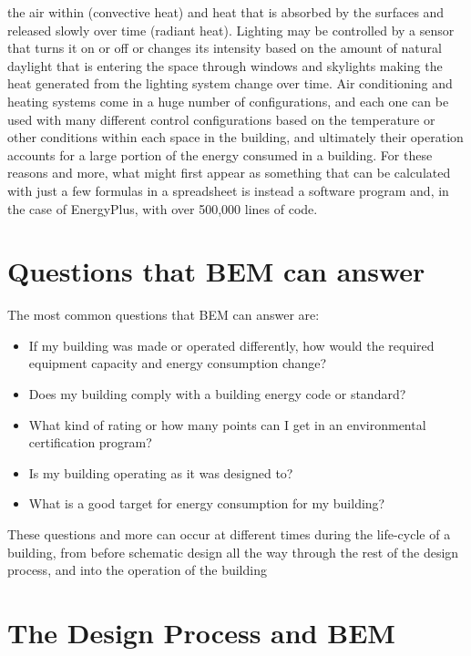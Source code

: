 the air within (convective heat) and heat that is absorbed by the
surfaces and released slowly over time (radiant heat). Lighting may
be controlled by a sensor that turns it on or off or changes its intensity
based on the amount of natural daylight that is entering the space
through windows and skylights making the heat generated from the lighting
system change over time. Air conditioning and heating systems come
in a huge number of configurations, and each one can be used with
many different control configurations based on the temperature or
other conditions within each space in the building, and ultimately
their operation accounts for a large portion of the energy consumed
in a building. For these reasons and more, what might first appear
as something that can be calculated with just a few formulas in a
spreadsheet is instead a software program and, in the case of EnergyPlus,
with over 500,000 lines of code.

\section{Questions that BEM can answer}

The most common questions that BEM can answer are:
\begin{itemize}
\item If my building was made or operated differently, how would the required
equipment capacity and energy consumption change?
\item Does my building comply with a building energy code or standard?
\item What kind of rating or how many points can I get in an environmental
certification program?
\item Is my building operating as it was designed to?
\item What is a good target for energy consumption for my building?
\end{itemize}
These questions and more can occur at different times during the life-cycle
of a building, from before schematic design all the way through the
rest of the design process, and into the operation of the building

\section{The Design Process and BEM }

